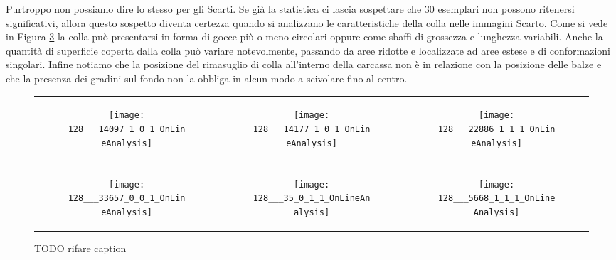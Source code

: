 
Purtroppo non possiamo dire lo stesso per gli Scarti.
Se già la statistica ci lascia sospettare che $30$ esemplari non possono ritenersi significativi, allora questo sospetto diventa certezza quando si analizzano le caratteristiche della colla nelle immagini Scarto.  
Come si vede in Figura \ref{fig:esempi_scarti} la colla può presentarsi in forma di gocce più o meno circolari oppure come sbaffi di grossezza e lunghezza variabili.
Anche la quantità di superficie coperta dalla colla può variare notevolmente, passando da aree ridotte e localizzate ad aree estese e di conformazioni singolari.
Infine notiamo che la posizione del rimasuglio di colla all'interno della carcassa non è in relazione con la posizione delle balze e che la presenza dei gradini sul fondo non la obbliga in alcun modo a scivolare fino al centro.

\begin{figure}[ht] %
  \begin{center}
    \begin{tabular}{ccc}

  \begin{subfigure}{.3\linewidth}
    \centering\texttt{[image: 128\_\_\_14097\_1\_0\_1\_OnLineAnalysis]}
    \caption{}
  \end{subfigure} &

  \begin{subfigure}{.3\linewidth}
      \texttt{[image: 128\_\_\_14177\_1\_0\_1\_OnLineAnalysis]}
      \caption{}
      \label{fig:esempi_scarti_sbaffo}
    \end{subfigure} &

  \begin{subfigure}{.3\linewidth}
      \texttt{[image: 128\_\_\_22886\_1\_1\_1\_OnLineAnalysis]}
      \caption{}
    \end{subfigure} \\ \\

  \begin{subfigure}{.3\linewidth}
      \texttt{[image: 128\_\_\_33657\_0\_0\_1\_OnLineAnalysis]}
      \caption{}
      \label{fig:esempi_scarti_goccia}
    \end{subfigure} &

  \begin{subfigure}{.3\linewidth}
      \texttt{[image: 128\_\_\_35\_0\_1\_1\_OnLineAnalysis]}
      \caption{}
    \end{subfigure} &

    \begin{subfigure}{.3\linewidth}
      \texttt{[image: 128\_\_\_5668\_1\_1\_1\_OnLineAnalysis]}
      \caption{}
    \end{subfigure} \\

    \end{tabular}
    \caption{TODO rifare caption}
    \label{fig:esempi_scarti}
  \end{center}
\end{figure}

